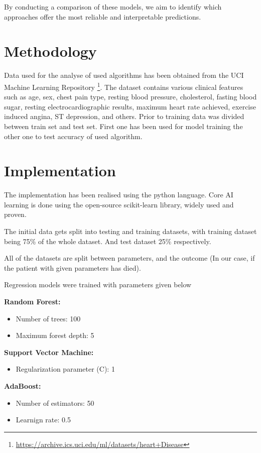 \documentclass[conference]{IEEEtran}
\begin{document}
By conducting a comparison of these models, we aim to identify which approaches offer the most reliable and interpretable predictions.

\section{Methodology}
Data used for the analyse of used algorithms has been 
obtained from the UCI Machine Learning Repository \footnote{\url{https://archive.ics.uci.edu/ml/datasets/heart+Disease}}.
The dataset contains various clinical features such as age, sex, chest pain type,
resting blood pressure, cholesterol, fasting blood sugar,
resting electrocardiographic results, maximum heart rate achieved,
exercise induced angina, ST depression, and others. Prior to training
data was divided between train set and test set. First one has been used
for model training the other one to test accuracy of used algorithm.

\section{Implementation}

The implementation has been realised using the python language. Core AI learning
is done using the open-source scikit-learn library, widely used and proven. 

The initial data gets split into testing and training datasets, with training
dataset being 75\% of the whole dataset. And test dataset 25\% respectively.

All of the datasets are split between parameters, and the outcome
(In our case, if the patient with given parameters has died).

Regression models were trained with parameters given below

\textbf{Random Forest:}
\begin{itemize}
    \item Number of trees: 100
    \item Maximum forest depth: 5
\end{itemize}

\textbf{Support Vector Machine:}
\begin{itemize}
    \item Regularization parameter (C): 1
\end{itemize}

\textbf{AdaBoost:}
\begin{itemize}
    \item Number of estimators: 50
    \item Learnign rate: 0.5
\end{itemize}
\end{document}

